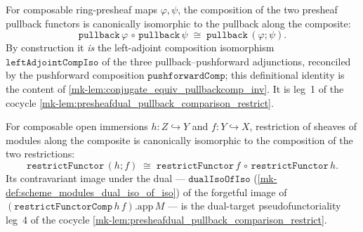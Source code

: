 \begin{lemma}
  \label{mk-lem:presheafofmodules_pullbackcomp}
  \mathlibok

  For composable ring-presheaf maps \(\varphi, \psi\), the composition of the two presheaf pullback
  functors is canonically isomorphic to the pullback along the composite:
  \[
    \mathtt{pullback}\,\varphi \,\circ\, \mathtt{pullback}\,\psi
      \;\cong\; \mathtt{pullback}\,(\varphi \mathbin{;} \psi).
  \]
  By construction it \emph{is} the left-adjoint composition isomorphism
  \(\mathtt{leftAdjointCompIso}\) of the three pullback--pushforward adjunctions, reconciled by the
  pushforward composition \(\mathtt{pushforwardComp}\); this definitional identity is the content of
  \ref{mk-lem:conjugate_equiv_pullbackcomp_inv}. It is leg~1 of the cocycle
  \ref{mk-lem:presheafdual_pullback_comparison_restrict}.
\end{lemma}

\begin{lemma}
  \label{mk-lem:scheme_modules_restrictfunctorcomp}
  \mathlibok

  For composable open immersions \(h : Z \hookrightarrow Y\) and \(f : Y \hookrightarrow X\), restriction
  of sheaves of modules along the composite is canonically isomorphic to the composition of the two
  restrictions:
  \[
    \mathtt{restrictFunctor}\,(h \mathbin{;} f)
      \;\cong\; \mathtt{restrictFunctor}\,f \,\circ\, \mathtt{restrictFunctor}\,h .
  \]
  Its contravariant image under the dual --- \(\mathtt{dualIsoOfIso}\)
  (\ref{mk-def:scheme_modules_dual_iso_of_iso}) of the forgetful image of
  \((\mathtt{restrictFunctorComp}\,h\,f).\mathrm{app}\,M\) --- is the dual-target pseudofunctoriality
  leg~4 of the cocycle \ref{mk-lem:presheafdual_pullback_comparison_restrict}.
\end{lemma}


